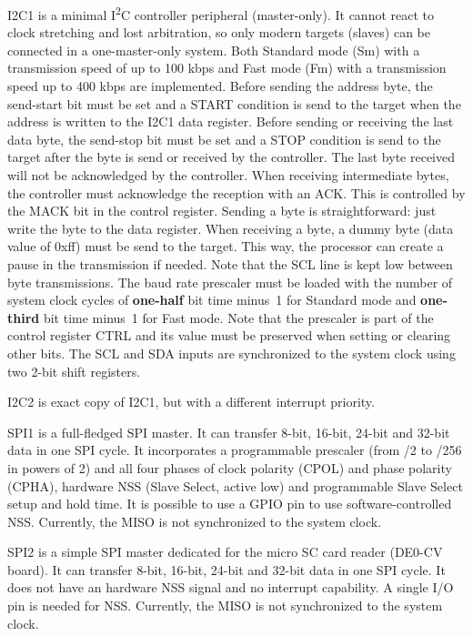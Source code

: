 \documentclass[12pt]{article}
\begin{document}
I2C1 is a minimal I\textsuperscript{2}C controller peripheral (master-only). It cannot react to clock stretching and lost arbitration, so only modern targets (slaves) can be connected in a one-master-only system. Both Standard mode (Sm) with a transmission speed of up to 100 kbps and Fast mode (Fm) with a transmission speed up to 400 kbps are implemented. Before sending the address byte, the send-start bit must be set and a START condition is send to the target when the address is written to the I2C1 data register. Before sending or receiving the last data byte, the send-stop bit must be set and a STOP condition is send to the target after the byte is send or received by the controller. The last byte received will not be acknowledged by the controller. When receiving intermediate bytes, the controller must acknowledge the reception with an ACK. This is controlled by the MACK bit in the control register. Sending a byte is straightforward: just write the byte to the data register. When receiving a byte, a dummy byte (data value of 0xff) must be send to the target. This way, the processor can create a pause in the transmission if needed. Note that the SCL line is kept low between byte transmissions. The baud rate prescaler must be loaded with the number of system clock cycles of \textbf{one-half} bit time minus~1 for Standard mode and \textbf{one-third} bit time minus~1 for Fast mode. Note that the prescaler is part of the control register CTRL and its value must be preserved when setting or clearing other bits. The SCL and SDA inputs are synchronized to the system clock using two 2-bit shift registers.

I2C2 is exact copy of I2C1, but with a different interrupt priority.

SPI1 is a full-fledged SPI master. It can transfer 8-bit, 16-bit, 24-bit and 32-bit data in one SPI cycle. It incorporates a programmable prescaler (from /2 to /256 in powers of 2) and all four phases of clock polarity (CPOL) and phase polarity (CPHA), hardware NSS (Slave Select, active low) and programmable Slave Select setup and hold time. It is possible to use a GPIO pin to use software-controlled NSS. Currently, the MISO is not synchronized to the system clock.

SPI2 is a simple SPI master dedicated for the micro SC card reader (DE0-CV board). It can transfer 8-bit, 16-bit, 24-bit and 32-bit data in one SPI cycle. It does not have an hardware NSS signal and no interrupt capability. A single I/O pin is needed for NSS. Currently, the MISO is not synchronized to the system clock.
\end{document}

